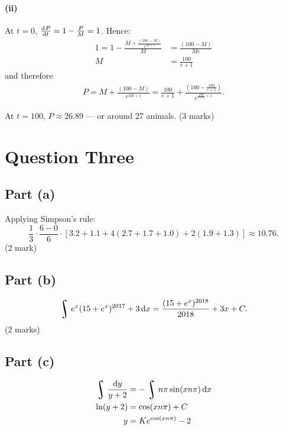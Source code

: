 \documentclass[a4paper]{report}
\DeclareMathOperator*{\rint}{\scalerel*{\rotatebox{17}{$\!\int\!$}}{\int}}
\begin{document}
\paragraph{(ii)}
At $ t = 0$, $ \od{P}{t} = 1 - \frac{P}{M} = 1 $. Hence:
\begin{align*}
  1 = 1 - \frac{M + \frac{(100 - M)}{e^{Mt + 1}}}{M} &= \frac{(100 - M)}{Me}\\
                                                   M &= \frac{100}{e + 1}
\end{align*}
and therefore
\begin{align*}
  P = M + \frac{(100 - M)}{e^{Mt + 1}} = \frac{100}{e + 1} + \frac{\left(100 - \frac{100}{e + 1}\right)}{e^{\frac{100t}{e + 1} + 1}}.
\end{align*}

At $ t = 100 $, $ P \approx 26.89 $ --- or around 27 animals.
(3 marks)

\section*{Question Three}
\subsection*{Part (a)}
Applying Simpson's rule:
\begin{displaymath}
  \frac{1}{3} \cdot \frac{6 - 0}{6} \cdot \left[ 3.2 + 1.1 + 4(2.7 + 1.7 + 1.0) + 2(1.9 + 1.3) \right] \approx 10.76.
\end{displaymath}
(2 mark)

\subsection*{Part (b)}
\begin{displaymath}
  \rint e^x (15 + e^x)^{2017} + 3 \dif{x} = \frac{(15 + e^x)^{2018}}{2018} + 3x + C.
\end{displaymath}
(2 marks)

\subsection*{Part (c)}
\begin{align*}
  \rint \frac{\dif{y}}{y + 2} &= -\rint n\pi \sin(xn \pi) \dif{x}\\
  \ln(y + 2) &= \cos(xn \pi) + C\\
  y &= Ke^{\cos(xn \pi)} - 2
\end{align*}
\end{document}

